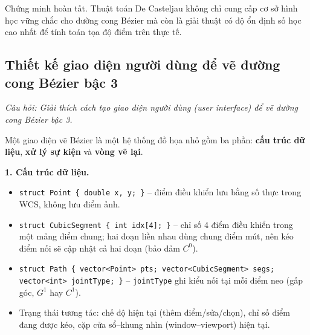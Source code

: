 Chứng minh hoàn tất. Thuật toán De Casteljau không chỉ cung cấp cơ sở hình học vững chắc cho đường cong Bézier mà còn là giải thuật có độ ổn định số học cao nhất để tính toán tọa độ điểm trên thực tế.

\subsection{Thiết kế giao diện người dùng để vẽ đường cong Bézier bậc 3}
\label{subsec:w5_ui}

\textit{Câu hỏi: Giải thích cách tạo giao diện người dùng (user interface) để vẽ đường cong Bézier bậc 3.}

Một giao diện vẽ Bézier là một hệ thống đồ họa nhỏ gồm ba phần: \textbf{cấu trúc dữ liệu}, \textbf{xử lý sự kiện} và \textbf{vòng vẽ lại}.

\textbf{1. Cấu trúc dữ liệu.}
\begin{itemize}
    \item \texttt{struct Point \{ double x, y; \}} -- điểm điều khiển lưu bằng số thực trong WCS, không lưu điểm ảnh.
    \item \texttt{struct CubicSegment \{ int idx[4]; \}} -- chỉ số 4 điểm điều khiển trong một mảng điểm chung; hai đoạn liền nhau dùng chung điểm mút, nên kéo điểm nối sẽ cập nhật cả hai đoạn (bảo đảm $C^0$).
    \item \texttt{struct Path \{ vector<Point> pts; vector<CubicSegment> segs; vector<int> jointType; \}} -- \texttt{jointType} ghi kiểu nối tại mỗi điểm neo (gấp góc, $G^1$ hay $C^1$).
    \item Trạng thái tương tác: chế độ hiện tại (thêm điểm/sửa/chọn), chỉ số điểm đang được kéo, cặp cửa sổ--khung nhìn (window--viewport) hiện tại.
\end{itemize}

